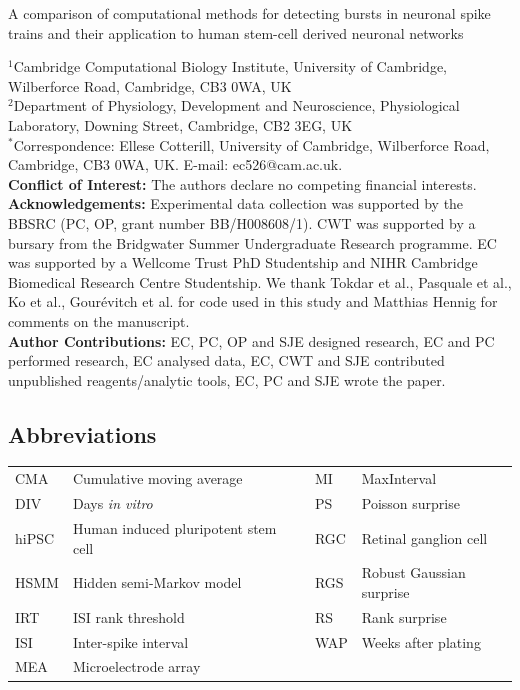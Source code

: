 \documentclass[12pt, titlepage]{article}
\begin{document}
	\begin{titlepage}
		\begin{center}
			
			{\LARGE   A comparison of computational methods for detecting bursts in neuronal spike trains and their application to human stem-cell derived neuronal networks}
			\\ 
		\end{center}
		\noindent$^1$Cambridge Computational Biology Institute, University of Cambridge, Wilberforce Road, Cambridge, CB3 0WA, UK
		\\$^2$Department of Physiology, Development and Neuroscience, Physiological Laboratory, Downing Street, Cambridge, CB2 3EG, UK
		\\$^*$Correspondence: Ellese Cotterill, University of Cambridge, Wilberforce Road, Cambridge,
		CB3 0WA, UK. E-mail: ec526@cam.ac.uk.
		\bigskip \\ \textbf{Conflict of Interest:} The authors declare no competing financial interests.
		\bigskip \\ \textbf{Acknowledgements:} Experimental data collection was supported by the BBSRC (PC, OP, grant number BB/H008608/1). CWT was supported by a bursary from the Bridgwater Summer Undergraduate Research programme. EC was supported by a Wellcome Trust PhD Studentship and NIHR Cambridge Biomedical Research Centre Studentship. We thank Tokdar et al., Pasquale et al., Ko et al., Gour\'{e}vitch et al. for code used in this study and Matthias Hennig for comments on the manuscript. 
		\bigskip \\ \textbf{Author Contributions:} EC, PC, OP and SJE designed research, EC and PC performed research, EC analysed data, EC, CWT and SJE contributed unpublished reagents/analytic tools, EC, PC and SJE wrote the paper.
	\end{titlepage}
	\subsection*{Abbreviations}
	\begin{tabular}{llll}
		\hline
		CMA & Cumulative moving average & MI & MaxInterval
		\\DIV &  Days \textit{in vitro} & PS &  Poisson surprise
		\\hiPSC & Human induced pluripotent stem cell \ \ \ &  RGC & Retinal ganglion cell
		\\HSMM &  Hidden semi-Markov model & RGS & Robust Gaussian surprise
		\\IRT & ISI rank threshold &	RS & Rank surprise
		\\ISI &  Inter-spike interval & WAP & Weeks after plating
		\\MEA & Microelectrode array & 
		\\ \hline
	\end{tabular}
\end{document}
